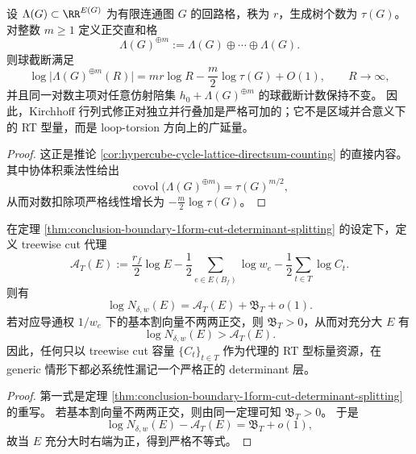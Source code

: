\begin{theorem}[回路格外置规模的行列式广延性]\label{thm:conclusion-cycle-lattice-determinant-extensivity}
设 \(\Lambda(G)\subset \RR^{E(G)}\) 为有限连通图 \(G\) 的回路格，秩为 \(r\)，生成树个数为 \(\tau(G)\)。
对整数 \(m\ge 1\) 定义正交直和格
\[
\Lambda(G)^{\oplus m}:=\Lambda(G)\oplus\cdots\oplus\Lambda(G).
\]
则球截断满足
\[
\log\bigl|\Lambda(G)^{\oplus m}(R)\bigr|
=
mr\log R-\frac{m}{2}\log\tau(G)+O(1),
\qquad
R\to\infty,
\]
并且同一对数主项对任意仿射陪集 \(h_0+\Lambda(G)^{\oplus m}\) 的球截断计数保持不变。
因此，Kirchhoff 行列式修正对独立并行叠加是严格可加的；它不是区域并合意义下的 RT 型量，而是 loop-torsion 方向上的广延量。
\end{theorem}

\begin{proof}
这正是推论 \ref{cor:hypercube-cycle-lattice-directsum-counting} 的直接内容。
其中协体积乘法性给出
\[
\operatorname{covol}\bigl(\Lambda(G)^{\oplus m}\bigr)=\tau(G)^{m/2},
\]
从而对数扣除项严格线性增长为 \(-\frac{m}{2}\log\tau(G)\)。
\end{proof}

\begin{corollary}\label{cor:conclusion-treewise-cut-proxy-misses-determinant-layer}
在定理 \ref{thm:conclusion-boundary-1form-cut-determinant-splitting} 的设定下，定义 treewise cut 代理
\[
\mathcal A_T(E):=
\frac{r_f}{2}\log E
-\frac12\sum_{e\in E(B_f)}\log w_e
-\frac12\sum_{t\in T}\log C_t.
\]
则有
\[
\log N_{\delta,w}(E)=\mathcal A_T(E)+\mathfrak B_T+o(1).
\]
若对应导通权 \(1/w_e\) 下的基本割向量不两两正交，则 \(\mathfrak B_T>0\)，从而对充分大 \(E\) 有
\[
\log N_{\delta,w}(E)>\mathcal A_T(E).
\]
因此，任何只以 treewise cut 容量 \(\{C_t\}_{t\in T}\) 作为代理的 RT 型标量资源，在 generic 情形下都必系统性漏记一个严格正的 determinant 层。
\end{corollary}

\begin{proof}
第一式是定理 \ref{thm:conclusion-boundary-1form-cut-determinant-splitting} 的重写。
若基本割向量不两两正交，则由同一定理可知 \(\mathfrak B_T>0\)。
于是
\[
\log N_{\delta,w}(E)-\mathcal A_T(E)=\mathfrak B_T+o(1),
\]
故当 \(E\) 充分大时右端为正，得到严格不等式。
\end{proof}

